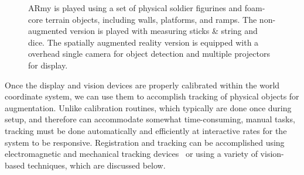 \documentclass[review]{vgtc}                 %
\begin{document}
\begin{figure}[t]
\vspace{-0.1in}
\caption{ARmy is played using a set of physical 
  soldier figurines and foam-core terrain objects, including walls,
  platforms, and ramps.  The non-augmented version is played with measuring sticks \& string and dice.  
The spatially augmented reality version is equipped with a overhead
single camera for object detection and multiple projectors for
display.  
}
\vspace{-0.1in}
\label{FIGURE:props_and_contraption}
\end{figure}

Once the display and vision devices are properly calibrated within the
world coordinate system, we can use them to accomplish tracking of
physical objects for augmentation.  Unlike calibration routines, which
typically are done once during setup, and therefore can accommodate
somewhat time-consuming, manual tasks, tracking must be done
automatically and efficiently at interactive rates for the system to
be responsive.  Registration and tracking can be accomplished using
electromagnetic and mechanical tracking devices~\cite{Cruz-Neira1993}
or using a variety of vision-based techniques, which are discussed
below.

\end{document}
